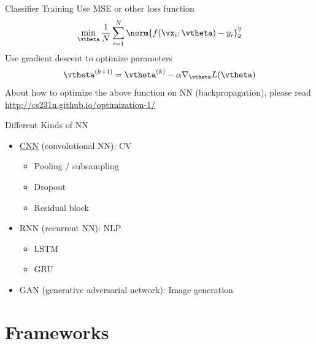 \documentclass{../TexTemplate/myslide}
\begin{document}
\begin{frame}{Classifier Training}
Use MSE or other loss function
\[\min_{\vtheta} \frac{1}{N}\sum_{i=1}^N\norm{f(\vx_i;\vtheta)-y_i}_2^2\]
Use gradient descent to optimize parameters
\[\vtheta^{(k+1)}=\vtheta^{(k)}-\alpha\nabla_{\vtheta} L(\vtheta)\]
About how to optimize the above function on NN (backpropagation), please read \url{http://cs231n.github.io/optimization-1/}
\end{frame}

\begin{frame}{Different Kinds of NN}
\begin{itemize}
	\item \href{https://ujjwalkarn.me/2016/08/11/intuitive-explanation-convnets/}{CNN} (convolutional NN): CV
	\begin{itemize}
		\item Pooling / subsampling
		\item Dropout
		\item Residual block
	\end{itemize}
	\item RNN (recurrent NN): NLP
	\begin{itemize}
		\item LSTM
		\item GRU
	\end{itemize}
	\item GAN (generative adversarial network): Image generation
\end{itemize}
\end{frame}

\section{Frameworks}
\begin{frame}
\sectionpage
\end{frame}
\end{document}
